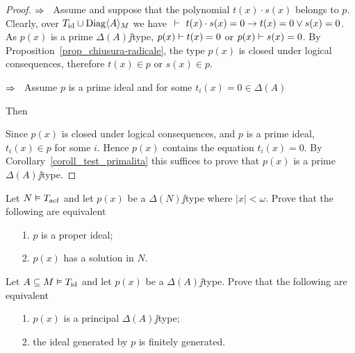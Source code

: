 \documentclass[creche.tex]{subfiles}
\begin{document}
\begin{proof}
$\IMP$ \ Assume  and suppose that the polynomial $t(x)\cdot s(x)$ belongs to $p$. Clearly, over $T_{\rm id} \cup\Diag\<A\>_M$  we have $\ \proves\ t(x)\cdot s(x)=0\imp  t(x)=0\vee s(x)=0$. As $p(x)$ is a prime $\Delta(A)\jj$type, $p(x)\proves t(x)=0$ or $p(x)\proves s(x)=0$. By Proposition~\ref{prop_chiusura-radicale}, the type $p(x)$ is closed under logical consequences, therefore $t(x)\in p$ or $s(x)\in p$.

$\IMP$ \ Assume $p$ is a prime ideal and for some $t_i(x)=0\in\Delta(A)$


Then


Since $p(x)$ is closed under logical consequences, and $p$ is a prime ideal, $t_i(x)\in p$ for some $i$. Hence $p(x)$ contains the equation $t_i(x)=0$. By Corollary~\ref{coroll_test_primalita} this suffices to prove that $p(x)$ is a prime $\Delta(A)\jj$type.
\end{proof}




\begin{exercise}\label{ex_weakNullstellensatz}Let $N\models T_{\rm acf}$ and let $p(x)$ be a $\Delta(N)\jj$type where $|x|<\omega$. Prove that the following are equivalent
\begin{itemize}
\item[1.] $p$ is a proper ideal;
\item[2.] $p(x)$ has a solution in $N$.\QED
\end{itemize}
\end{exercise}


\begin{exercise}\label{ex_fingen_principal}
Let $A\subseteq M\models T_{\rm id}$ and let $p(x)$ be a $\Delta(A)\jj$type. Prove that the following are equivalent
\begin{itemize}
\item[1.] $p(x)$ is a principal $\Delta(A)\jj$type;
\item[2.] the ideal generated by $p$ is finitely generated.\QED
\end{itemize}
\end{exercise}
\end{document}

